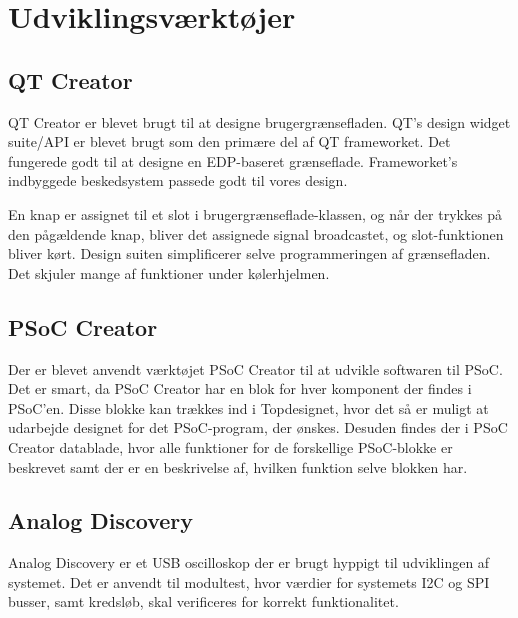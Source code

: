 \chapter{Udviklingsværktøjer}

\section{QT Creator}
QT Creator er blevet brugt til at designe brugergrænsefladen.
QT's design widget suite/API er blevet brugt som den primære del af QT frameworket. Det fungerede godt til at designe en EDP-baseret grænseflade. Frameworket's indbyggede beskedsystem passede godt til vores design.

En knap er assignet til et slot i brugergrænseflade-klassen, og når der trykkes på den pågældende knap, bliver det assignede signal broadcastet, og slot-funktionen bliver kørt.
Design suiten simplificerer selve programmeringen af grænsefladen. Det skjuler mange af funktioner under kølerhjelmen.

\section{PSoC Creator}
Der er blevet anvendt værktøjet PSoC Creator til at udvikle softwaren til PSoC. Det er smart, da PSoC Creator har en blok for hver komponent der findes i PSoC'en. Disse blokke kan trækkes ind i Topdesignet, hvor det så er muligt at udarbejde designet for det PSoC-program, der ønskes. Desuden findes der i PSoC Creator datablade, hvor alle funktioner for de forskellige PSoC-blokke er beskrevet samt der er en beskrivelse af, hvilken funktion selve blokken har.

\section{Analog Discovery}
Analog Discovery er et USB oscilloskop der er brugt hyppigt til udviklingen af systemet. Det er anvendt til modultest, hvor værdier for systemets I2C og SPI busser, samt kredsløb, skal verificeres for korrekt funktionalitet.